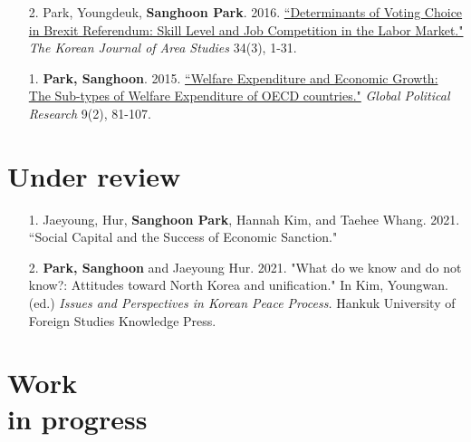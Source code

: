 \documentclass[margin,line]{res}
\begin{document}
\begin{resume}
\begin{enumerate}[leftmargin=*]
\item[2.] Park, Youngdeuk, \textbf{Sanghoon Park}. 2016. \href{http://kiss.kstudy.com/thesis/thesis-view.asp?key=3472800}{``Determinants of Voting Choice in Brexit Referendum: Skill Level and Job Competition in the Labor Market."} \textit{The Korean Journal of Area Studies} 34(3), 1-31.	
\item[1.] \textbf{Park, Sanghoon}. 2015. \href{http://search.koreanstudies.net/thesis/thesis-view.asp?key=3438155}{``Welfare Expenditure and Economic Growth: The Sub-types of Welfare Expenditure of OECD countries."} \textit{Global Political Research} 9(2), 81-107.	
\end{enumerate}

\section{\sc Under review}

\begin{enumerate}[leftmargin=*]
\item[1.] Jaeyoung, Hur, \textbf{Sanghoon Park}, Hannah Kim, and Taehee Whang. 2021. ``Social Capital and the Success of Economic Sanction."
\item[2.] \textbf{Park, Sanghoon} and Jaeyoung Hur. 2021. "What do we know and do not know?: Attitudes toward North Korea and unification." In Kim, Youngwan. (ed.) {\it Issues and Perspectives in Korean Peace Process.} Hankuk University of Foreign Studies Knowledge Press.
\end{enumerate}



\section{\sc Work\\in progress}


\end{resume}
\end{document}
